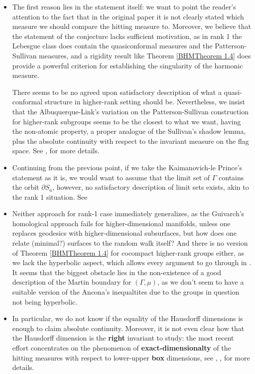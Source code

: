 \documentclass[11pt]{amsart}
\theoremstyle{definition}
\begin{document}
	\begin{itemize}
		\item The first reason lies in the statement itself: we want to point the reader's attention to the fact that in the original paper it is not clearly stated which measure we should compare the hitting measure to. Moreover, we believe that the statement of the conjecture lacks sufficient motivation, as in rank 1 the Lebesgue class does contain the quasiconformal measures and the Patterson-Sullivan measures, and a rigidity result like Theorem \ref{BHMTheorem 1.4} does provide a powerful criterion for establishing the singularity of the harmonic measure.
		
		There seems to be no agreed upon satisfactory description of what a quasi-conformal structure in higher-rank setting should be. Nevertheless, we insist that the Albuquerque-Link's variation on the Patterson-Sullivan construction for higher-rank subgroups seems to be the closest to what we want, having the non-atomic property, a proper analogue of the Sullivan's shadow lemma, plus the absolute continuity with respect to the invariant measure on the flag space. See \cite{albuq}, \cite{linkhausdorff} for more details.
		\item Continuing from the previous point, if we take the Kaimanovich-le Prince's statement as it is, we would want to assume that the limit set of $\Gamma$ contains the orbit $\partial S_a$, however, no satisfactory description of limit sets exists, akin to the rank 1 situation. See 
		\item Neither approach for rank-1 case immediately generalizes, as the Guivarch's homological approach fails for higher-dimensional manifolds, unless one replaces geodesics with higher-dimensional subsurfaces, but how does one relate (minimal?) surfaces to the random walk itself? And there is no version of Theorem \ref{BHMTheorem 1.4} for cocompact higher-rank groups either, as we lack the hyperbolic aspect, which allows every argument to go through in \cite{blachere2011harmonic}. It seems that the biggest obstacle lies in the non-existence of a good description of the Martin boundary for $(\Gamma, \mu)$, as we don't seem to have a suitable version of the Ancona's inequaltites due to the groups in question not being hyperbolic.
		\item In particular, we do not know if the equality of the Hausdorff dimensions is enough to claim absolute continuity. Moreover, it is not even clear how that the Hausdorff dimension is the \textbf{right} invariant to study: the most recent effort concentrates on the phenomenon of \textbf{exact-dimensionalty} of the hitting measures with respect to lower-upper \textbf{box} dimensions, see \cite{kaimanovich2011matrix}, \cite{lessaledrappier1}, \cite{ledrappier2023exact} for more details. 

\end{itemize}
\end{document}
